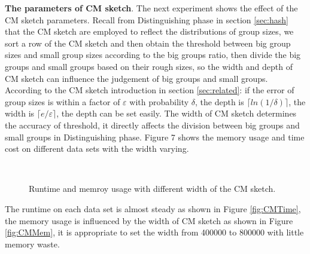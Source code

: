 \textbf{The parameters of CM sketch}. The next experiment shows the effect of the CM sketch parameters. Recall from Distinguishing phase in section \ref{sec:hash} that the CM sketch are employed to reflect the distributions of group sizes, we sort a row of the CM sketch and then obtain the threshold between big group sizes and small group sizes according to the big groups ratio, then divide the big groups and small groups based on their rough sizes, so the width and depth of CM sketch can influence the judgement of big groups and small groups. According to the CM sketch introduction in section \ref{sec:related}: if the error of group sizes is within a factor of $ \varepsilon $ with probability $ \delta$, the depth is $\lceil ln(1/\delta)\rceil $, the width is $\lceil e/\varepsilon\rceil $, the depth can be set easily. The width of CM sketch determines the accuracy of threshold, it directly affects the division between big groups and small groups in Distinguishing phase. Figure 7 shows the memory usage and time cost on different data sets with the width varying.
\begin{figure}[htbp]
	\label{fig: CMPara}
       \hspace{0.23cm}
    \\    
	\caption{Runtime and memroy usage with different width of the CM sketch.}	
	
\end{figure}

The runtime on each data set is almost steady as shown in Figure \ref{fig:CMTime}, the memory usage is influenced by the width of CM sketch as shown in Figure \ref{fig:CMMem}, it is appropriate to set the width from 400000 to 800000 with little memory waste.   

